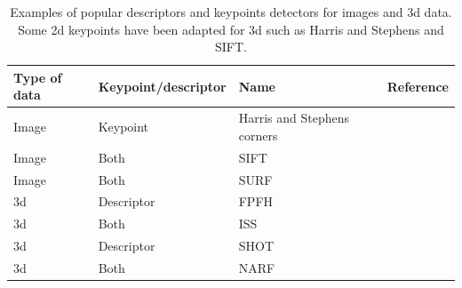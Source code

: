 \begin{table}[H]
    \centering
    \begin{tabular}{@{}llll@{}}
        \toprule
        \textbf{Type of data}  & \textbf{Keypoint/descriptor} & \textbf{Name}               & \textbf{Reference} \\
        \hline
        Image                  & Keypoint                     & Harris and Stephens corners & \cite{Harris1988}  \\
        Image                  & Both                         & SIFT                        & \cite{Lowe2004}    \\
        Image                  & Both                         & SURF                        & \cite{Bay2006}     \\
        \gls*{3d}              & Descriptor                   & FPFH                        & \cite{Rusu2009}    \\
        \gls*{3d}              & Both                         & ISS                         & \cite{Yu2009}      \\
        \gls*{3d}              & Descriptor                   & SHOT                        & \cite{Tombari2010} \\
        \gls*{3d}              & Both                         & NARF                        & \cite{Steder2011a} \\
        \bottomrule
    \end{tabular}
    \caption{ Examples of popular descriptors and keypoints detectors for images and \gls*{3d} data. Some \gls*{2d} keypoints have been adapted for \gls*{3d} such as Harris and Stephens and SIFT.}
    \label{tab:chap_slam_features_examples}
\end{table}


